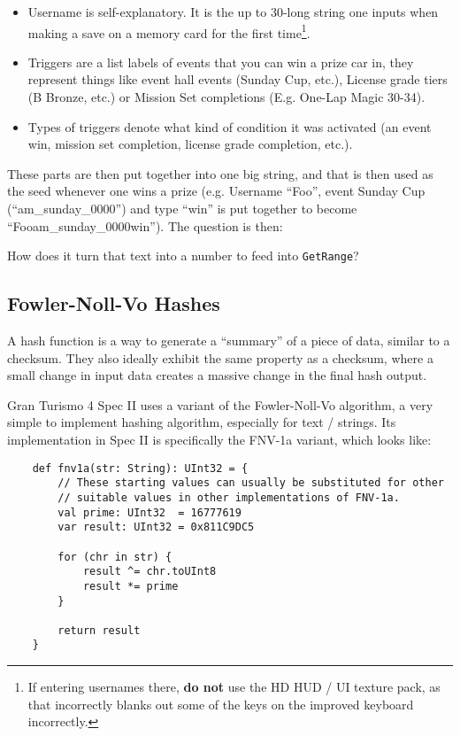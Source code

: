 \documentclass[12pt,a4paper,notitlepage]{extarticle}
\begin{document}
        \begin{itemize}
            \item Username is self-explanatory. It is the up to 30-long string one inputs when
            making a save on a memory card for the first time\footnote{If entering usernames
            there, \textbf{do not} use the HD HUD / UI texture pack, as that incorrectly blanks
            out some of the keys on the improved keyboard incorrectly.}.
            \item Triggers are a list labels of events that you can win a prize car in, they
            represent things like event hall events (Sunday Cup, etc.), License grade tiers (B
            Bronze, etc.) or Mission Set completions (E.g. One-Lap Magic 30-34).
            \item Types of triggers denote what kind of condition it was activated (an event
            win, mission set completion, license grade completion, etc.).
        \end{itemize}

        \noindent These parts are then put together into one big string, and that is then used
        as the seed whenever one wins a prize (e.g. Username ``Foo'', event Sunday Cup
        (``am\_sunday\_0000'') and type ``win'' is put together to become
        ``Fooam\_sunday\_0000win''). The question is then:

        \begin{center}
            How does it turn that text into a number to feed into \texttt{GetRange}?
        \end{center}

        \subsection*{Fowler-Noll-Vo Hashes}
            A hash function is a way to generate a ``summary'' of a piece of data, similar to
            a checksum. They also ideally exhibit the same property as a checksum, where a
            small change in input data creates a massive change in the final hash output.

            Gran Turismo 4 Spec II uses a variant of the Fowler-Noll-Vo algorithm, a very simple
            to implement hashing algorithm, especially for text / strings. Its implementation
            in Spec II is specifically the FNV-1a variant, which looks like:

            \begin{lstlisting}
    def fnv1a(str: String): UInt32 = {
        // These starting values can usually be substituted for other
        // suitable values in other implementations of FNV-1a.
        val prime: UInt32  = 16777619
        var result: UInt32 = 0x811C9DC5

        for (chr in str) {
            result ^= chr.toUInt8
            result *= prime
        }

        return result
    }
            \end{lstlisting}
\end{document}
